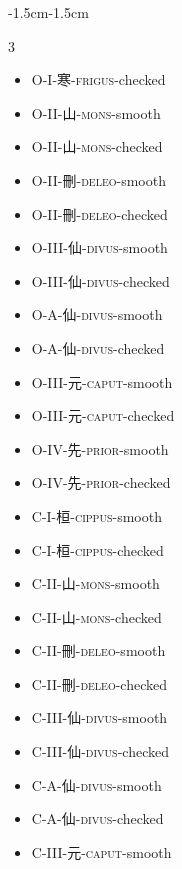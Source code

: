 \begin{adjustwidth}{-1.5cm}{-1.5cm}
\begin{multicols}{3}
\begin{itemize}[label={}, leftmargin=*]
  \item O-I-寒-\textsc{frigus}-checked \hfill {}
  \item O-II-山-\textsc{mons}-smooth \hfill {}
  \item O-II-山-\textsc{mons}-checked \hfill {}
  \item O-II-刪-\textsc{deleo}-smooth \hfill {}

  \item O-II-刪-\textsc{deleo}-checked \hfill {}
  \item O-III-仙-\textsc{divus}-smooth \hfill {}
  \item O-III-仙-\textsc{divus}-checked \hfill {}
  \item O-A-仙-\textsc{divus}-smooth \hfill {}

  \item O-A-仙-\textsc{divus}-checked \hfill {}
  \item O-III-元-\textsc{caput}-smooth \hfill {}
  \item O-III-元-\textsc{caput}-checked \hfill {}
  \item O-IV-先-\textsc{prior}-smooth \hfill {}

  \item O-IV-先-\textsc{prior}-checked \hfill {}
  \item C-I-桓-\textsc{cippus}-smooth \hfill {}
  \item C-I-桓-\textsc{cippus}-checked \hfill {}
  \item C-II-山-\textsc{mons}-smooth \hfill {}

  \item C-II-山-\textsc{mons}-checked \hfill {}
  \item C-II-刪-\textsc{deleo}-smooth \hfill {}
  \item C-II-刪-\textsc{deleo}-checked \hfill {}
  \item C-III-仙-\textsc{divus}-smooth \hfill {}

  \item C-III-仙-\textsc{divus}-checked \hfill {}
  \item C-A-仙-\textsc{divus}-smooth \hfill {}
  \item C-A-仙-\textsc{divus}-checked \hfill {}
  \item C-III-元-\textsc{caput}-smooth \hfill {}


\end{itemize}
\end{multicols}
\end{adjustwidth}
